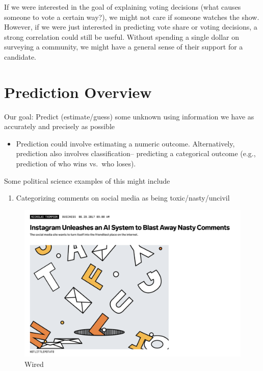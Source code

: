 \documentclass[
  letterpaper,
  DIV=11,
  numbers=noendperiod]{scrreprt}
\providecommand{\tightlist}{%
  \setlength{\itemsep}{0pt}\setlength{\parskip}{0pt}}\usepackage{longtable,booktabs,array}
\begin{document}
If we were interested in the goal of explaining voting decisions (what
causes someone to vote a certain way?), we might not care if someone
watches the show. However, if we were just interested in predicting vote
share or voting decisions, a strong correlation could still be useful.
Without spending a single dollar on surveying a community, we might have
a general sense of their support for a candidate.

\hypertarget{prediction-overview}{%
\section{Prediction Overview}\label{prediction-overview}}

Our goal: Predict (estimate/guess) some unknown using information we
have as accurately and precisely as possible

\begin{itemize}
\tightlist
\item
  Prediction could involve estimating a numeric outcome. Alternatively,
  prediction also involves classification-- predicting a categorical
  outcome (e.g., prediction of who wins vs.~who loses).
\end{itemize}

Some political science examples of this might include

\begin{enumerate}
\def\labelenumi{\arabic{enumi}.}
\tightlist
\item
  Categorizing comments on social media as being toxic/nasty/uncivil
\end{enumerate}

\begin{figure}

{\centering \includegraphics{images/instagramhate.png}

}

\caption{Wired}

\end{figure}
\end{document}
